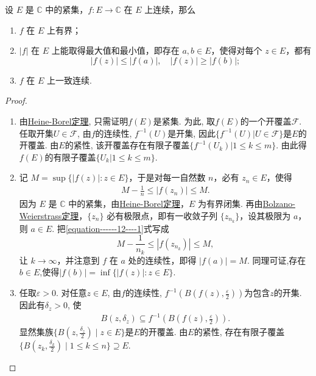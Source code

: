 \documentclass[../../main.tex]{subfiles}%
\begin{document}
\begin{theorem}\label{theorem:连续的复变函数在紧集上的性质}
设 $E$ 是 $\mathbb{C}$ 中的紧集，$f: E \to \mathbb{C}$ 在 $E$ 上连续，那么
\begin{enumerate}[(1)]
\item $f$ 在 $E$ 上有界；

\item $|f|$ 在 $E$ 上能取得最大值和最小值，即存在 $a, b \in E$，使得对每个 $z \in E$，都有
\[
|f(z)| \leqslant |f(a)|, \quad |f(z)| \geqslant |f(b)|;
\]

\item $f$ 在 $E$ 上一致连续.
\end{enumerate}
\end{theorem}
\begin{proof}
\begin{enumerate}[(1)]
\item 由\hyperref[theorem:Heine-Borel定理]{Heine-Borel定理}, 只需证明$f(E)$是紧集. 为此, 取$f(E)$的一个开覆盖$\mathcal{F}$. 任取开集$U\in\mathcal{F}$, 由$f$的连续性, $f^{-1}(U)$是开集, 因此$\{f^{-1}(U)|U\in\mathcal{F}\}$是$E$的开覆盖. 由$E$的紧性, 该开覆盖存在有限子覆盖$\{f^{-1}(U_k)|1\leqslant k\leqslant m\}$. 由此得$f(E)$的有限子覆盖$\{U_k|1\leqslant k\leqslant m\}$.

\item 记 $M = \sup\{|f(z)|: z \in E\}$，于是对每一自然数 $n$，必有 $z_n \in E$，使得
\begin{align}\label{equation------12----1}
M - \frac{1}{n} \leqslant |f(z_n)| \leqslant M.
\end{align}
因为 $E$ 是 $\mathbb{C}$ 中的紧集，由\hyperref[theorem:Heine-Borel定理]{Heine-Borel定理}，$E$ 为有界闭集. 再由\hyperref[theorem:Bolzano-Weierstrass定理]{Bolzano-Weierstrass定理}，$\{z_n\}$ 必有极限点，即有一收敛子列 $\{z_{n_k}\}$，设其极限为 $a$，则 $a \in E$. 把\eqref{equation------12----1}式写成
\[
M - \frac{1}{n_k} \leqslant |f(z_{n_k})| \leqslant M,
\]
让 $k \to \infty$，并注意到 $f$ 在 $a$ 处的连续性，即得 $|f(a)| = M$. 
同理可证,存在$b\in E$,使得$|f(b)|=\inf\{|f(z)|:z\in E\}.$

\item 任取$\varepsilon>0$. 对任意$z\in E$, 由$f$的连续性, $f^{-1}(B(f(z),\frac{\varepsilon}{2}))$为包含$z$的开集. 因此有$\delta_z>0$, 使
\begin{align}\label{eq::-o2jgegmi23jsmvismq}
B(z,\delta_z)\subseteq f^{-1}(B(f(z),\frac{\varepsilon}{2})).
\end{align}
显然集族$\{B(z,\frac{\delta_z}{2})\mid z\in E\}$是$E$的开覆盖. 由$E$的紧性, 存在有限子覆盖$\{B(z_k,\frac{\delta_k}{2})\mid 1\leqslant k\leqslant n\}\supseteq E$.


\end{enumerate}
\end{proof}
\end{document}
